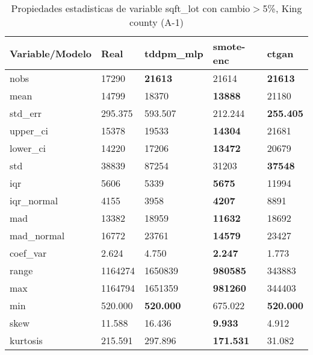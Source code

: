 \begin{table}[H]
\centering
\fontsize{8}{14}\selectfont
\caption{Propiedades estadisticas de variable sqft\_lot con cambio\ensuremath{>}5\%, King county (A-1)}
\label{table-stats-king county-a-1-sqft_lot-short}
\begin{tabular}{|l|m{10em}|m{10em}|m{10em}|m{10em}|}
\hline
 \rowcolor[gray]{0.8}
Variable/Modelo & Real & tddpm\_mlp & smote-enc & ctgan \\
\hline nobs & 17290 & \bfseries 21613 & \cellcolor[rgb]{0.9, 0.54, 0.52} 21614 & \bfseries 21613 \\
\hline mean & 14799 & 18370 & \bfseries 13888 & \cellcolor[rgb]{0.9, 0.54, 0.52} 21180 \\
\hline std\_err & 295.375 & \cellcolor[rgb]{0.9, 0.54, 0.52} 593.507 & 212.244 & \bfseries 255.405 \\
\hline upper\_ci & 15378 & 19533 & \bfseries 14304 & \cellcolor[rgb]{0.9, 0.54, 0.52} 21681 \\
\hline lower\_ci & 14220 & 17206 & \bfseries 13472 & \cellcolor[rgb]{0.9, 0.54, 0.52} 20679 \\
\hline std & 38839 & \cellcolor[rgb]{0.9, 0.54, 0.52} 87254 & 31203 & \bfseries 37548 \\
\hline iqr & 5606 & 5339 & \bfseries 5675 & \cellcolor[rgb]{0.9, 0.54, 0.52} 11994 \\
\hline iqr\_normal & 4155 & 3958 & \bfseries 4207 & \cellcolor[rgb]{0.9, 0.54, 0.52} 8891 \\
\hline mad & 13382 & \cellcolor[rgb]{0.9, 0.54, 0.52} 18959 & \bfseries 11632 & 18692 \\
\hline mad\_normal & 16772 & \cellcolor[rgb]{0.9, 0.54, 0.52} 23761 & \bfseries 14579 & 23427 \\
\hline coef\_var & 2.624 & \cellcolor[rgb]{0.9, 0.54, 0.52} 4.750 & \bfseries 2.247 & 1.773 \\
\hline range & 1164274 & 1650839 & \bfseries 980585 & \cellcolor[rgb]{0.9, 0.54, 0.52} 343883 \\
\hline max & 1164794 & 1651359 & \bfseries 981260 & \cellcolor[rgb]{0.9, 0.54, 0.52} 344403 \\
\hline min & 520.000 & \bfseries 520.000 & \cellcolor[rgb]{0.9, 0.54, 0.52} 675.022 & \bfseries 520.000 \\
\hline skew & 11.588 & 16.436 & \bfseries 9.933 & \cellcolor[rgb]{0.9, 0.54, 0.52} 4.912 \\
\hline kurtosis & 215.591 & 297.896 & \bfseries 171.531 & \cellcolor[rgb]{0.9, 0.54, 0.52} 31.082 \\

\end{tabular}
\end{table}
